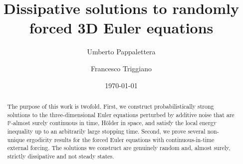 \documentclass[10pt,a4paper]{amsart}
\numberwithin{equation}{section}
\numberwithin{corollario}{section}
\numberwithin{lemma}{section}
\numberwithin{prop}{section}
\theoremstyle{definition}
\theoremstyle{remark}
\begin{document}
\title[Dissipative solutions to randomly forced 3D Euler equations]{Dissipative solutions to randomly forced 3D Euler equations}
\author[U. Pappalettera]{Umberto Pappalettera}
  \address{Departement Mathematik und Informatik, Universit\"at Basel, Spiegelgasse 1,
4051 Basel, Switzerland}
\author[F. Triggiano]{Francesco Triggiano}
  \address{Scuola Normale Superiore, Piazza dei Cavalieri, 7, 56126 Pisa, Italia}

\date{\today}
\begin{abstract}
The purpose of this work is twofold. First, we construct probabilistically strong solutions to the three-dimensional Euler equations perturbed by additive noise that are $\mathbb{P}$-almost surely continuous in time, H\"older in space, and satisfy the local energy inequality up to an arbitrarily large stopping time.
Second, we prove several non-unique ergodicity results for the forced Euler equations with continuous-in-time external forcing.
The solutions we construct are genuinely random and, almost surely, strictly dissipative and not steady states.
\end{abstract}
\maketitle

\vspace{-1cm}

\setcounter{secnumdepth}{4}
\setcounter{tocdepth}{4}
\tableofcontents
\end{document}

